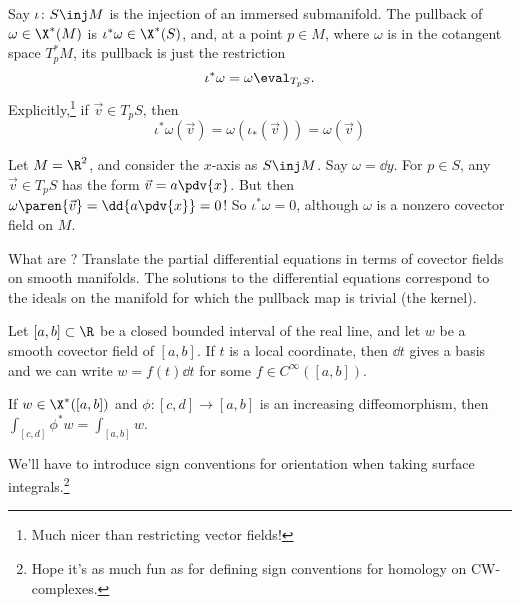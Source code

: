 \begin{prop}
    Say $\iota \colon S \inj M$ is the injection of an immersed submanifold. The pullback of $\omega \in \X^*(M)$ is $\iota^* \omega \in \X^*(S)$, and, at a point $p \in M$, where $\omega$ is in the cotangent space $T_p^*M$, its pullback is just the restriction
    \begin{equation*}
      \iota^* \omega = \omega\eval_{T_p S}.
    \end{equation*}
Explicitly,\footnote{Much nicer than restricting vector fields!}
if $\vec v \in T_p S$, then 
\begin{equation*}\iota^* \omega(\vec v) = \omega(\iota_*(\vec v)) = \omega(\vec v)\end{equation*}
\end{prop}


\begin{ex}[]
    Let $M = \R^2$, and consider the $x$-axis as $S \inj M$.
    Say $\omega = \dd{y}$. 
    For $p \in S$, any $\vec v \in T_p S$ has the form $\vec v = a \pdv{x}$. 
    But then $\omega \paren{\vec v} = \dd{a \pdv{x} } = 0$! 
    So $\iota^* \omega = 0$, although $\omega$ is a nonzero covector field on $M$.
\end{ex}

\begin{rem}
    What are ? Translate the partial differential equations in terms of covector fields on smooth manifolds. The solutions to the differential equations correspond to the ideals on the manifold for which the pullback map is trivial (the kernel).
\end{rem}

\begin{ex}
    Let $[a,b] \subset \R$ be a closed bounded interval of the real line, and let $w$ be a smooth covector field of $[a,b]$. If $t$ is a local coordinate, then $\dd{t}$ gives a basis and we can write $w = f(t)\dd{t}$ for some $f \in C^\infty([a,b])$.
\end{ex}

\begin{prop}[]
    \label{welldefd}
    If $w \in \X^*([a,b])$ and $\phi \colon [c,d] \to [a,b]$ is an increasing diffeomorphism, then $\int_{[c,d]} \phi^* w = \int_{[a,b]} w$.
\end{prop}

We'll have to introduce sign conventions for orientation when taking surface integrals.\footnote{Hope it's as much fun as for defining sign conventions for homology on CW-complexes.}

